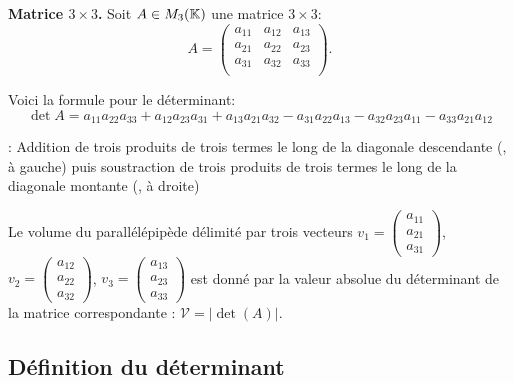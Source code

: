 \documentclass[10pt,class=article,crop=false]{standalone}
\begin{document}
\begin{multicols}{2}
\begin{proposition}
\begin{center}
\begin{minipage}{0.15\textwidth}
\end{minipage}
\end{center}		
\end{proposition}


\textbf{Matrice $3 \times 3$.}
Soit $A \in M_3(\mathbb{K})$ une matrice $3 \times 3$:
$$A = \begin{pmatrix}
	a_{11} & a_{12} & a_{13} \\
	a_{21} & a_{22} & a_{23} \\
	a_{31} & a_{32} & a_{33} \\
\end{pmatrix}.$$

Voici la formule pour le déterminant:
$$\det A =
a_{11} a_{22} a_{33}
+ a_{12} a_{23} a_{31}
+ a_{13} a_{21} a_{32}
- a_{31} a_{22} a_{13}
- a_{32} a_{23} a_{11}
- a_{33} a_{21} a_{12}$$

 :
Addition de trois produits de trois termes le long de la diagonale descendante (, à gauche)
puis soustraction de trois produits de trois termes le long de la diagonale montante (, à droite)



\begin{proposition}\label{prop:volume}
Le volume du parallélépipède 
délimité par trois vecteurs 
$v_1=\left(\begin{smallmatrix}a_{11}\\a_{21}\\a_{31}\end{smallmatrix}\right)$,
$v_2=\left(\begin{smallmatrix}a_{12}\\a_{22}\\a_{32}\end{smallmatrix}\right)$,
$v_3=\left(\begin{smallmatrix}a_{13}\\a_{23}\\a_{33}\end{smallmatrix}\right)$
est donné par la valeur absolue du déterminant de la matrice correspondante : $\mathcal{V} = \Big|\det(A)\Big|.$
\end{proposition}



\subsection{Définition du déterminant}


\end{multicols}
\end{document}
